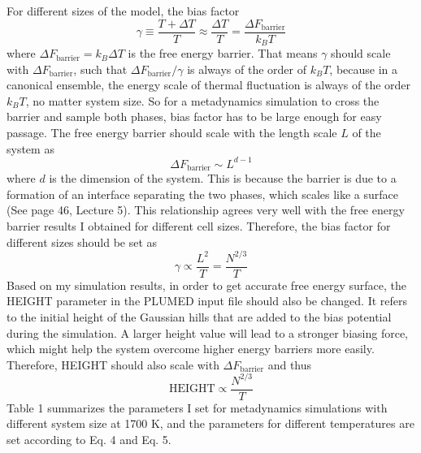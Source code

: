 \documentclass{article}
\begin{document}
For different sizes of the model, the bias factor
\begin{equation}
    \gamma \equiv \frac{T + \Delta T}{T} \approx \frac{\Delta T}{T} = \frac{\Delta F_{\text{barrier}}}{k_B T}
\end{equation}
where $\Delta F_{\text{barrier}} = k_B \Delta T$ is the free energy barrier. That means $\gamma$ should scale with $\Delta F_{\text{barrier}}$, such that $\Delta F_{\text{barrier}} / \gamma$ is always of the order of $k_B T$, because in a canonical ensemble, the energy scale of thermal fluctuation is always of the order $k_B T$, no matter system size. So for a metadynamics simulation to cross the barrier and sample both phases, bias factor has to be large enough for easy passage. The free energy barrier should scale with the length scale $L$ of the system as
\begin{equation}
    \Delta F_{\text{barrier}} \sim L^{d - 1}
\end{equation}
where $d$ is the dimension of the system. This is because the barrier is due to a formation of an interface separating the two phases, which scales like a surface (See page 46, Lecture 5). This relationship agrees very well with the free energy barrier results I obtained for different cell sizes. Therefore, the bias factor for different sizes should be set as
\begin{equation}
    \gamma \propto \frac{L^2}{T} = \frac{N^{2/3}}{T}
\end{equation}
Based on my simulation results, in order to get accurate free energy surface, the HEIGHT parameter in the PLUMED input file should also be changed. It refers to the initial height of the Gaussian hills that are added to the bias potential during the simulation. A larger height value will lead to a stronger biasing force, which might help the system overcome higher energy barriers more easily. Therefore, HEIGHT should also scale with $\Delta F_{\text{barrier}}$ and thus
\begin{equation}
    \text{HEIGHT} \propto \frac{N^{2/3}}{T}
\end{equation}
Table 1 summarizes the parameters I set for metadynamics simulations with different system size at 1700 K, and the parameters for different temperatures are set according to Eq. 4 and Eq. 5.
\end{document}
